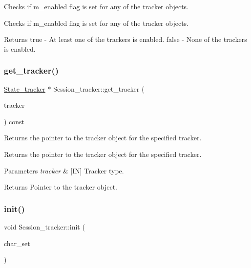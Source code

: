 Checks if m\+\_\+enabled flag is set for any of the tracker objects. 

Checks if m\+\_\+enabled flag is set for any of the tracker objects.

\begin{DoxyReturn}{Returns}
true -\/ At least one of the trackers is enabled. false -\/ None of the trackers is enabled. 
\end{DoxyReturn}
\mbox{\label{classSession__tracker_a6df3f03511206e6dc60a66ccd7f6e30f}} 
\subsubsection{\texorpdfstring{get\+\_\+tracker()}{get\_tracker()}}
{\footnotesize\ttfamily \mbox{\hyperlink{classState__tracker}{State\+\_\+tracker}} $\ast$ Session\+\_\+tracker\+::get\+\_\+tracker (\begin{DoxyParamCaption}\item[{enum\+\_\+session\+\_\+tracker}]{tracker }\end{DoxyParamCaption}) const}



Returns the pointer to the tracker object for the specified tracker. 

Returns the pointer to the tracker object for the specified tracker.


\begin{DoxyParams}{Parameters}
{\em tracker} & \mbox{[}IN\mbox{]} Tracker type.\\
\hline
\end{DoxyParams}
\begin{DoxyReturn}{Returns}
Pointer to the tracker object. 
\end{DoxyReturn}
\mbox{\label{classSession__tracker_a9998b3724108bcffd2c2e66c8c497d85}} 
\subsubsection{\texorpdfstring{init()}{init()}}
{\footnotesize\ttfamily void Session\+\_\+tracker\+::init (\begin{DoxyParamCaption}\item[{const C\+H\+A\+R\+S\+E\+T\+\_\+\+I\+N\+FO $\ast$}]{char\+\_\+set }\end{DoxyParamCaption})}



